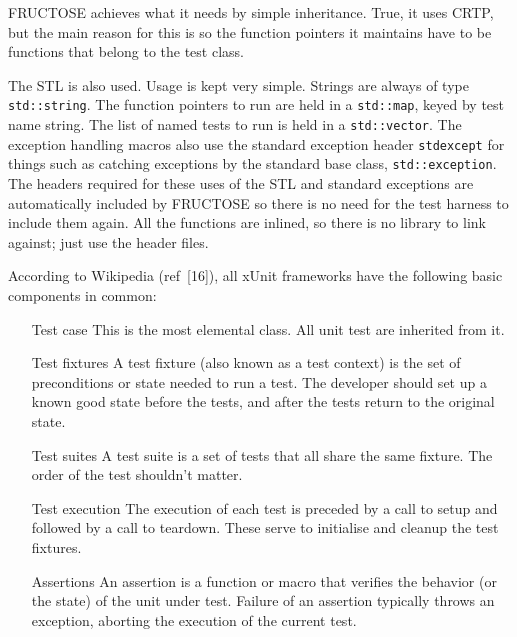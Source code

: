 \documentclass{book}
\begin{document}
FRUCTOSE achieves what it needs by simple inheritance.
True, it uses CRTP, but the main reason for this is so the function pointers
it maintains have to be functions that belong to the test class.

The STL is also used. Usage is kept very simple. Strings are always of type
{\tt std::string}. The function pointers to run are held in a {\tt std::map},
keyed by test name string.
The list of named tests to run is held in a {\tt std::vector}.
The exception handling macros also use the standard exception
header {\tt stdexcept} for things such as catching exceptions
by the standard base class,\hfil\break
{\tt std::exception}.
The headers required for these uses of the STL and standard exceptions
are automatically included by FRUCTOSE so there is no need for the
test harness to include them again.
All the functions are inlined, so there is no library to link
against; just use the header files.

\label{xunit}


According to Wikipedia (ref~[16]), all xUnit frameworks
have the following basic components in common:

\begin{itemize}
\item[Test case]
This is the most elemental class. All unit test are inherited from it.

\item[Test fixtures]
A test fixture (also known as a test context) is the set of preconditions 
or state needed to run a test. The developer should set up a known good state 
before the tests, and after the tests return to the original state.

\item[Test suites]
A test suite is a set of tests that all share the same fixture. 
The order of the test shouldn't matter.

\item[Test execution]
The execution of each test is preceded by a call
to setup and followed by a call to teardown. 
These serve to initialise and cleanup the test fixtures.

\item[Assertions]
An assertion is a function or macro that verifies the behavior (or the state) 
of the unit under test. Failure of an assertion typically throws an exception, 
aborting the execution of the current test.

\end{itemize}
\end{document}
